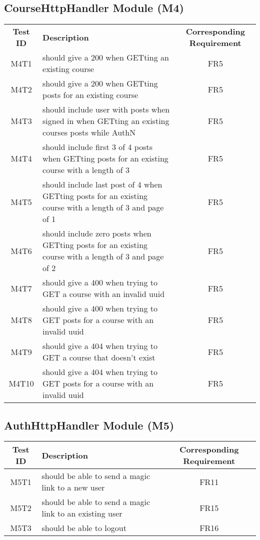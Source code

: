 \documentclass[fullpage]{article}
\begin{document}
\subsection{CourseHttpHandler Module (M4)}
\begin{table}[H]
\flushleft
\begin{tabular}{|c|p{8.5cm}|c|}
\hline
 \rowcolor{lightgray} 
\textbf{Test ID} &\textbf{Description} &\textbf{Corresponding Requirement}\\
M4T1 & should give a 200 when GETting an existing course & FR5 \\
\hline 
M4T2 & should give a 200 when GETting posts for an existing course & FR5 \\
\hline
M4T3 & should include user with posts when signed in when GETting an existing courses posts while AuthN & FR5 \\
\hline
M4T4 & should include first 3 of 4 posts when GETting posts for an existing course with a length of 3 & FR5 \\
\hline
M4T5 & should include last post of 4 when GETting posts for an existing course with a length of 3 and page of 1 & FR5 \\
\hline
M4T6 & should include zero posts when GETting posts for an existing course with a length of 3 and page of 2 & FR5 \\
\hline
M4T7 & should give a 400 when trying to GET a course with an invalid uuid & FR5 \\
\hline
M4T8 & should give a 400 when trying to GET posts for a course with an invalid uuid & FR5 \\
\hline
M4T9 & should give a 404 when trying to GET a course that doesn't exist & FR5 \\
\hline
M4T10 & should give a 404 when trying to GET posts for a course with an invalid uuid & FR5 \\
\hline

\end{tabular}
\end{table}


\subsection{AuthHttpHandler Module (M5)}
\begin{table}[H]
\flushleft
\begin{tabular}{|c|p{8.5cm}|c|}
\hline
 \rowcolor{lightgray} 
\textbf{Test ID} &\textbf{Description} &\textbf{Corresponding Requirement}\\
\hline
M5T1 & should be able to send a magic link to a new user & FR11 \\
\hline
M5T2 & should be able to send a magic link to an existing user & FR15 \\
\hline
M5T3 & should be able to logout & FR16 \\
\hline
\end{tabular}
\end{table}
\end{document}
